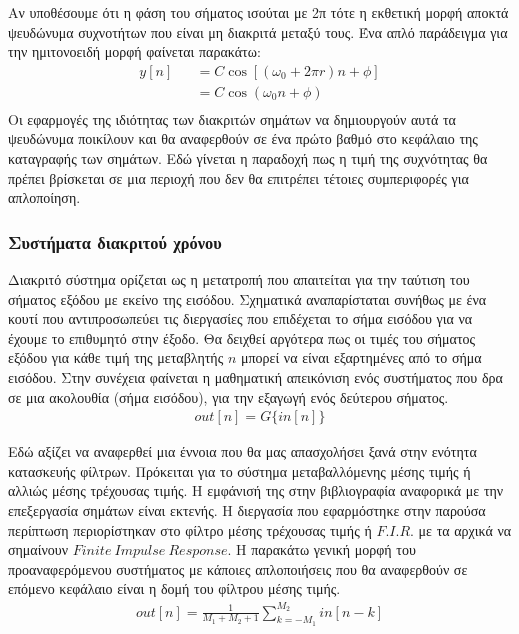 \documentclass[breaklines=true, 12pt]{article}
\begin{document}
Αν υποθέσουμε ότι η φάση του σήματος ισούται με 2π τότε η εκθετική μορφή αποκτά
ψευδώνυμα συχνοτήτων που είναι μη διακριτά μεταξύ τους. Ένα απλό παράδειγμα
για την ημιτονοειδή μορφή φαίνεται παρακάτω:
\begin{equation}
\begin{align}
y[n]&&=C \cos[(\omega_{0} + 2\pi r)n + \phi] \\
&&=C \cos(\omega_{0}n + \phi) \\
\end{align}
\end{equation}
Οι εφαρμογές της ιδιότητας των διακριτών σημάτων να δημιουργούν αυτά τα ψευδώνυμα
ποικίλουν και θα αναφερθούν σε ένα πρώτο βαθμό στο κεφάλαιο της καταγραφής των
σημάτων. Εδώ γίνεται η παραδοχή πως η τιμή της συχνότητας θα πρέπει βρίσκεται
σε μια περιοχή που δεν θα επιτρέπει τέτοιες συμπεριφορές για απλοποίηση.
\subsubsection{Συστήματα διακριτού χρόνου}
\label{sec:org134fe5e}
Διακριτό σύστημα ορίζεται ως η μετατροπή που απαιτείται για την
ταύτιση του σήματος εξόδου με εκείνο της εισόδου. Σχηματικά
αναπαρίσταται συνήθως με ένα κουτί που αντιπροσωπεύει τις διεργασίες
που επιδέχεται το σήμα εισόδου για να έχουμε το επιθυμητό στην έξοδο.
Θα δειχθεί αργότερα πως οι τιμές του σήματος εξόδου για κάθε τιμή
της μεταβλητής \(n\) μπορεί να είναι εξαρτημένες από το σήμα εισόδου.
Στην συνέχεια φαίνεται η μαθηματική απεικόνιση ενός συστήματος που
δρα σε μια ακολουθία (σήμα εισόδου), για την εξαγωγή ενός δεύτερου
σήματος.
\begin{equation}
\begin{align}
out[n] = G\{in[n]\}
\end{align}
\end{equation}

Εδώ αξίζει να αναφερθεί μια έννοια που θα μας απασχολήσει ξανά στην
ενότητα κατασκευής φίλτρων. Πρόκειται για το σύστημα μεταβαλλόμενης μέσης
τιμής ή αλλιώς μέσης τρέχουσας τιμής. Η εμφάνισή της στην βιβλιογραφία
αναφορικά με την επεξεργασία σημάτων είναι εκτενής. Η διεργασία που
εφαρμόστηκε στην παρούσα περίπτωση  περιορίστηκαν στο φίλτρο μέσης
τρέχουσας τιμής ή \(F.I.R.\) με τα αρχικά να σημαίνουν \(Finite\ Impulse\ Response\).
Η παρακάτω γενική μορφή του προαναφερόμενου συστήματος με κάποιες
απλοποιήσεις που θα αναφερθούν σε επόμενο κεφάλαιο είναι η δομή του
φίλτρου μέσης τιμής.
\begin{equation}
\begin{align}
out[n] = \frac{1}{M_{1}+M_{2}+1}\sum_{k=-M_{1}}^{M_{2}} in[n-k]
\end{align}
\end{equation}
\end{document}

